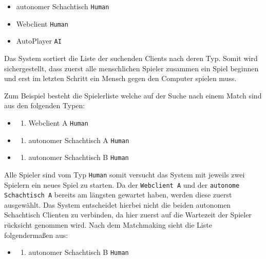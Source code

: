 \begin{itemize}
\tightlist
\item
  autonomer Schachtisch \passthrough{\lstinline!Human!}
\item
  Webclient \passthrough{\lstinline!Human!}
\item
  AutoPlayer \passthrough{\lstinline!AI!}
\end{itemize}

Das System sortiert die Liste der suchenden Clients nach deren Typ.
Somit wird sichergestellt, dass zuerst alle menschlichen Spieler
zusammen ein Spiel beginnen und erst im letzten Schritt ein Mensch gegen
den Computer spielen muss.

Zum Beispiel besteht die Spielerliste welche auf der Suche nach einem
Match sind aus den folgenden Typen:

\begin{itemize}
\item
  \begin{enumerate}
  \def\labelenumi{\arabic{enumi}.}
  \tightlist
  \item
    Webclient A \passthrough{\lstinline!Human!}
  \end{enumerate}
\item
  \begin{enumerate}
  \def\labelenumi{\arabic{enumi}.}
  \setcounter{enumi}{1}
  \tightlist
  \item
    autonomer Schachtisch A \passthrough{\lstinline!Human!}
  \end{enumerate}
\item
  \begin{enumerate}
  \def\labelenumi{\arabic{enumi}.}
  \setcounter{enumi}{2}
  \tightlist
  \item
    autonomer Schachtisch B \passthrough{\lstinline!Human!}
  \end{enumerate}
\end{itemize}

Alle Spieler sind vom Typ \passthrough{\lstinline!Human!} somit versucht
das System mit jeweils zwei Spielern ein neues Spiel zu starten. Da der
\passthrough{\lstinline!Webclient A!} und der
\passthrough{\lstinline!autonome Schachtisch A!} bereits am längsten
gewartet haben, werden diese zuerst ausgewählt. Das System entscheidet
hierbei nicht die beiden autonomen Schachtisch Clienten zu verbinden, da
hier zuerst auf die Wartezeit der Spieler rücksicht genommen wird. Nach
dem Matchmaking sieht die Liste folgendermaßen aus:

\begin{itemize}
\item
  \begin{enumerate}
  \def\labelenumi{\arabic{enumi}.}
  \tightlist
  \item
    autonomer Schachtisch B \passthrough{\lstinline!Human!}
  \end{enumerate}
\end{itemize}

